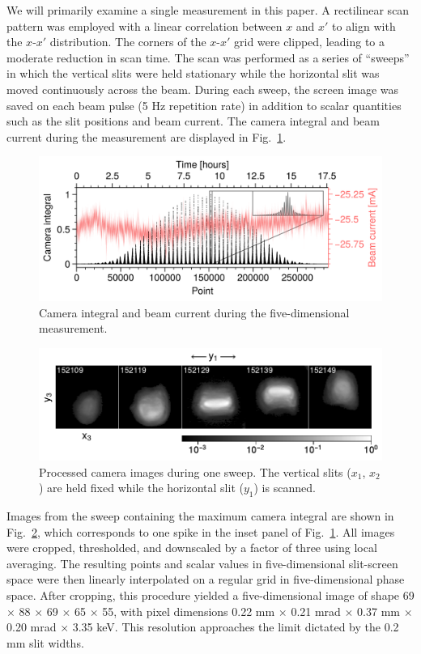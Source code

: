 \documentclass[%
 reprint,
 amsmath,amssymb,
 aps,
prstab,
]{revtex4-2}
\begin{document}
We will primarily examine a single measurement in this paper. A rectilinear scan pattern was employed with a linear correlation between $x$ and $x'$ to align with the $x$-$x'$ distribution. The corners of the $x$-$x'$ grid were clipped, leading to a moderate reduction in scan time. The scan was performed as a series of ``sweeps'' in which the vertical slits were held stationary while the horizontal slit was moved continuously across the beam. During each sweep, the screen image was saved on each beam pulse (5 Hz repetition rate) in addition to scalar quantities such as the slit positions and beam current. The camera integral and beam current during the measurement are displayed in Fig.~\ref{fig:scan_a}.
%
\begin{figure}
    \centering
    \includegraphics[width=\columnwidth]{fig_bcm.png}
    \caption{Camera integral and beam current during the five-dimensional measurement.}
    \label{fig:scan_a}
\end{figure}
%
%
\begin{figure}
    \centering
    \includegraphics[width=\columnwidth]{fig_sweep.pdf}
    \caption{Processed camera images during one sweep. The vertical slits ($x_1$, $x_2$) are held fixed while the horizontal slit ($y_1$) is scanned.}
    \label{fig:scan_b}
\end{figure}
%

Images from the sweep containing the maximum camera integral are shown in Fig.~\ref{fig:scan_b}, which corresponds to one spike in the inset panel of Fig.~\ref{fig:scan_a}. All images were cropped, thresholded, and downscaled by a factor of three using local averaging. The resulting points and scalar values in five-dimensional slit-screen space were then linearly interpolated on a regular grid in five-dimensional phase space. After cropping, this procedure yielded a five-dimensional image of shape 69 $\times$ 88 $\times$ 69 $\times$ 65 $\times$ 55, with pixel dimensions 0.22 mm $\times$ 0.21 mrad $\times$ 0.37 mm $\times$ 0.20 mrad $\times$ 3.35 keV. This resolution approaches the limit dictated by the 0.2 mm slit widths.
\end{document}
